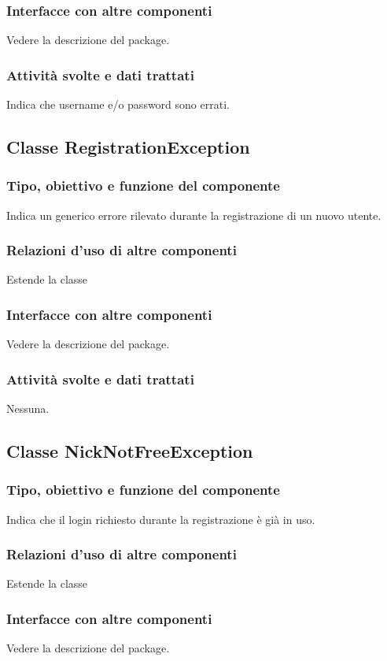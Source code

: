 \subsubsection*{Interfacce con altre componenti}
Vedere la descrizione del package.
\subsubsection*{Attivit\`a svolte e dati trattati}
Indica che username e/o password sono errati.

\subsection{Classe RegistrationException}
\subsubsection*{Tipo, obiettivo e funzione del componente}
Indica un generico errore rilevato durante la registrazione di un nuovo utente.
\subsubsection*{Relazioni d'uso di altre componenti}
Estende la classe 
\subsubsection*{Interfacce con altre componenti}
Vedere la descrizione del package.
\subsubsection*{Attivit\`a svolte e dati trattati}
Nessuna.

\subsection{Classe NickNotFreeException}
\subsubsection*{Tipo, obiettivo e funzione del componente}
Indica che il login richiesto durante la registrazione \`e gi\`a in uso.
\subsubsection*{Relazioni d'uso di altre componenti}
Estende la classe 
\subsubsection*{Interfacce con altre componenti}
Vedere la descrizione del package.
